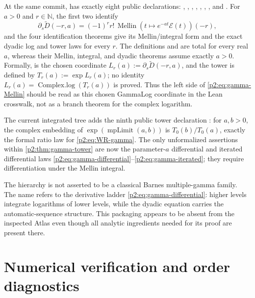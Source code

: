 \documentclass[11pt,oneside]{article}
\numberwithin{equation}{section}
\theoremstyle{definition}
\theoremstyle{remark}
\newcommand{\N}{\mathbb N}
\begin{document}
At the same commit,  has exactly eight public
declarations:
,
,
,
,
,
,
, and
.  For \(a>0\) and \(r\in\N\),
the first two identify
\[
 \partial_s\widetilde D(-r,a)=(-1)^r r!\,
 \operatorname{Mellin}(t\mapsto e^{-at}\mathcal E(t))(-r),
\]
and the four identification theorems give its Mellin/integral form and the
exact dyadic log and tower laws for every \(r\).  The definitions
 and
 are total for every real \(a\), whereas
their Mellin, integral, and dyadic theorems assume exactly \(a>0\).  Formally,
 is the chosen coordinate
\(L_r(a):=\partial_s\widetilde D(-r,a)\), and the tower is defined by
\(T_r(a):=\exp L_r(a)\); no identity
\(L_r(a)=\operatorname{Complex.log}(T_r(a))\) is proved.  Thus the left side of
\eqref{p2:eq:gamma-Mellin} should be read as this chosen GammaLog coordinate in
the Lean crosswalk, not as a branch theorem for the complex logarithm.

The current integrated tree adds the ninth public tower declaration
: for \(a,b>0\), the
complex embedding of \(\exp(\operatorname{mpLimit}(a,b))\) is
\(T_0(b)/T_0(a)\), exactly the formal ratio law for
\eqref{p2:eq:WR-gamma}.  The only unformalized assertions within
\cref{p2:thm:gamma-tower} are now the parameter-\(a\) differential and iterated
differential laws \eqref{p2:eq:gamma-differential}--\eqref{p2:eq:gamma-iterated};
they require differentiation under the Mellin integral.

\begin{remark}
The hierarchy is not asserted to be a classical Barnes multiple-gamma family.  The name refers
to the derivative ladder \eqref{p2:eq:gamma-differential}: higher levels integrate logarithms of
lower levels, while the dyadic equation carries the automatic-sequence structure.  This
packaging appears to be absent from the inspected Atlas even though all analytic ingredients
needed for its proof are present there.
\end{remark}

\section{Numerical verification and order diagnostics}
\label{p2:sec:numerics}
\end{document}
